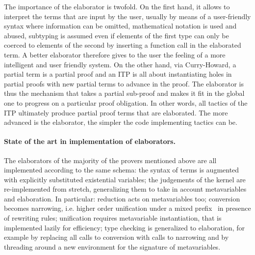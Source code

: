 \documentclass{easychair}
\begin{document}
The importance of the elaborator is twofold. On the first hand, it
allows to interpret the terms that are input by the user, usually by
means of a user-friendly syntax where information can be omitted,
mathematical notation is used and abused, subtyping is assumed even if
elements of the first type can only be coerced to elements of the
second by inserting a function call in the elaborated term. A better
elaborator therefore gives to the user the feeling of a more
intelligent and user friendly system. On the other hand, via
Curry-Howard, a partial term is a partial proof and an ITP is all
about instantiating holes in partial proofs with new partial terms to
advance in the proof. The elaborator is thus the mechanism that takes
a partial sub-proof and makes it fit in the global one to progress on
a particular proof obligation. In other words, all tactics of the ITP
ultimately produce partial proof terms that are elaborated. The more
advanced is the elaborator, the simpler the code implementing tactics
can be.


\paragraph{State of the art in implementation of elaborators.}

The elaborators of the majority of the provers mentioned above are all
implemented according to the same schema: the syntax of terms is
augmented with explicitly substituted existential variables; the
judgements of the kernel are re-implemented from stretch, generalizing
them to take in account metavariables and elaboration. In particular:
reduction acts on metavariables too; conversion becomes narrowing,
i.e. higher order unification under a mixed prefix~\cite{???} in
presence of rewriting rules; unification requires metavariable
instantiation, that is implemented lazily for efficiency; type
checking is generalized to elaboration, for example by replacing all
calls to conversion with calls to narrowing and by threading around a
new environment for the signature of metavariables.
\end{document}
